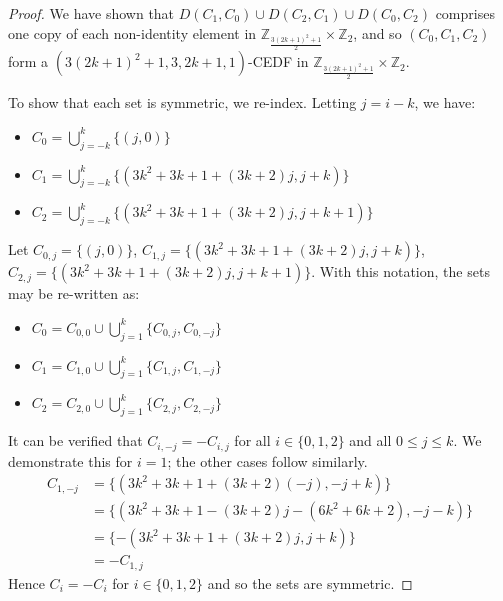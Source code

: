 \documentclass[10pt,a4paper]{amsart}
\begin{document}
\begin{proof}
We have shown that $D(C_1,C_0) \cup D(C_2,C_1) \cup D(C_0,C_2)$ comprises one copy of each non-identity element in $\mathbb{Z}_{\frac{3(2k+1)^2+1}{2}}\times\mathbb{Z}_2$, and so $(C_0,C_1,C_2)$ form a $(3(2k+1)^2+1,3,2k+1,1)$-CEDF in $\mathbb{Z}_{\frac{3(2k+1)^2+1}{2}}\times\mathbb{Z}_2$.

To show that each set is symmetric, we re-index. Letting $j =i-k$, we have:
\begin{itemize}
\item $C_0=\bigcup_{j=-k}^{k}\{(j,0)\}$
\item $C_1=\bigcup_{j=-k}^{k}\{(3k^2+3k+1+(3k+2)j,j+k)\}$
\item $C_2=\bigcup_{j=-k}^{k}\{(3k^2+3k+1+(3k+2)j,j+k+1)\}$
\end{itemize}
Let $C_{0,j}=\{(j,0)\}$, $C_{1,j}=\{(3k^2+3k+1+(3k+2)j,j+k)\}$, $C_{2,j}=\{(3k^2+3k+1+(3k+2)j,j+k+1)\}$.  With this notation, the sets may be re-written as:
\begin{itemize}
\item $C_0= C_{0,0} \cup \bigcup_{j=1}^{k}\{C_{0,j},C_{0,-j}\}$
\item $C_1= C_{1,0} \cup \bigcup_{j=1}^{k}\{C_{1,j},C_{1,-j}\}$
\item $C_2= C_{2,0} \cup \bigcup_{j=1}^{k}\{C_{2,j},C_{2,-j}\}$
\end{itemize}
It can be verified that $C_{i,-j}=-C_{i,j}$ for all $i \in \{0,1,2\}$ and all $0 \leq j \leq k$. We demonstrate this for $i=1$; the other cases follow similarly. 
\begin{align*}
C_{1,-j}&=\{(3k^2+3k+1+(3k+2)(-j),-j+k)\}\\
    &=\{(3k^2+3k+1-(3k+2)j-(6k^2+6k+2),-j-k)\}\\
    &=\{-(3k^2+3k+1+(3k+2)j,j+k)\} \\
    &= -C_{1,j}
\end{align*}
Hence $C_{i}=-C_i$ for $i \in \{0,1,2\}$ and so the sets are symmetric.
\end{proof}
\end{document}
